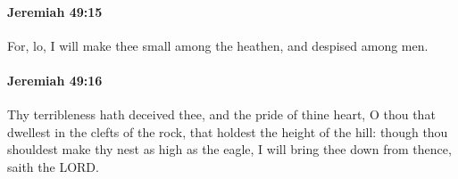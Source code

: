 		\paragraph{Jeremiah 49:15} %
			\label{JEREMIAH-49-15}

			For, lo, I will make thee small among the heathen, and despised among men.


		\paragraph{Jeremiah 49:16} %
			\label{JEREMIAH-49-16}

			Thy terribleness hath deceived thee, and the pride of thine heart, O thou that dwellest in the clefts of the rock, that holdest the height of the hill: though thou shouldest make thy nest as high as the eagle, I will bring thee down from thence, saith the LORD.



